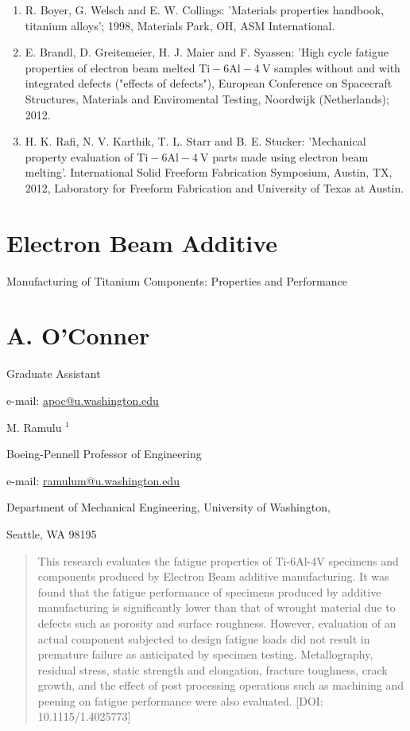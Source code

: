 \documentclass[10pt]{article}
\begin{document}
\begin{enumerate}
  \item R. Boyer, G. Welsch and E. W. Collings: 'Materials properties handbook, titanium alloys'; 1998, Materials Park, OH, ASM International.

  \item E. Brandl, D. Greitemeier, H. J. Maier and F. Syassen: 'High cycle fatigue properties of electron beam melted $\mathrm{Ti}-6 \mathrm{Al}-4 \mathrm{~V}$ samples without and with integrated defects ("effects of defects"), European Conference on Spacecraft Structures, Materials and Enviromental Testing, Noordwijk (Netherlands); 2012.

  \item H. K. Rafi, N. V. Karthik, T. L. Starr and B. E. Stucker: 'Mechanical property evaluation of $\mathrm{Ti}-6 \mathrm{Al}-4 \mathrm{~V}$ parts made using electron beam melting'. International Solid Freeform Fabrication Symposium, Austin, TX, 2012, Laboratory for Freeform Fabrication and University of Texas at Austin.

\end{enumerate}

\section*{Electron Beam Additive}
Manufacturing of Titanium Components: Properties and Performance

\section*{A. O'Conner}
Graduate Assistant

e-mail: \href{mailto:apoc@u.washington.edu}{apoc@u.washington.edu}

M. Ramulu ${ }^{1}$

Boeing-Pennell Professor of Engineering

e-mail: \href{mailto:ramulum@u.washington.edu}{ramulum@u.washington.edu}

Department of Mechanical Engineering, University of Washington,

Seattle, WA 98195

\begin{abstract}
This research evaluates the fatigue properties of Ti-6Al-4V specimens and components produced by Electron Beam additive manufacturing. It was found that the fatigue performance of specimens produced by additive manufacturing is significantly lower than that of wrought material due to defects such as porosity and surface roughness. However, evaluation of an actual component subjected to design fatigue loads did not result in premature failure as anticipated by specimen testing. Metallography, residual stress, static strength and elongation, fracture toughness, crack growth, and the effect of post processing operations such as machining and peening on fatigue performance were also evaluated. [DOI: 10.1115/1.4025773]
\end{abstract}
\end{document}
